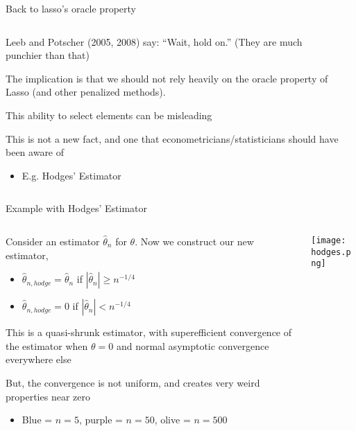\documentclass[notes,11pt, aspectratio=169]{beamer}
\newenvironment{wideitemize}{\itemize\addtolength{\itemsep}{10pt}}{\enditemize}
\begin{document}
\begin{frame}{Back to lasso's  oracle property}
  \begin{columns}[T] %
    \begin{column}{.8\textwidth}
      \begin{wideitemize}
      \item Leeb and Potscher (2005, 2008) say:  ``Wait, hold on.'' (They are much punchier than that)
      \item The implication is that we should not rely heavily on the
        oracle property of Lasso (and other penalized methods).
      \item This ability to select elements can be misleading
      \item This is not a new fact, and one that econometricians/statisticians should have been aware of
        \begin{itemize}
        \item E.g. Hodges' Estimator
        \end{itemize}
      \end{wideitemize}
    \end{column}%
  \hfill%
  \begin{column}{.5\textwidth}
  \end{column}
\end{columns}
\end{frame}


\begin{frame}{Example with Hodges' Estimator}
  \begin{columns}[T] %
    \begin{column}{.6\textwidth}
      \begin{wideitemize}
      \item Consider an estimator $\hat{\theta}_{n}$ for $\theta$. Now we construct our new estimator,
        \begin{itemize}
        \item $\hat{\theta}_{n,hodge} = \hat{\theta}_{n}$ if $|\hat{\theta}_{n}|  \geq n^{-1/4}$
        \item $\hat{\theta}_{n,hodge} = 0$ if $|\hat{\theta}_{n}|  < n^{-1/4}$          
        \end{itemize}
      \item This is a quasi-shrunk estimator, with superefficient
        convergence of the estimator when $\theta = 0$ and normal
        asymptotic convergence everywhere else
      \item But, the convergence is not uniform, and creates very weird properties near zero
        \begin{itemize}
        \item Blue = $n=5$, purple = $n=50$, olive = $n=500$
        \end{itemize}
      \end{wideitemize}
    \end{column}%
  \hfill%
  \begin{column}{.4\textwidth}
    \texttt{[image: hodges.png]}
  \end{column}
\end{columns}
\end{frame}
\end{document}
